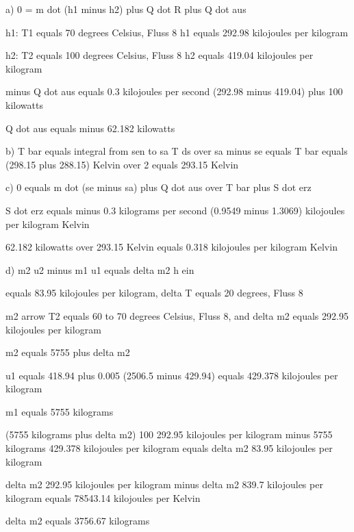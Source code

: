 a) 0 = m dot (h1 minus h2) plus Q dot R plus Q dot aus

h1: T1 equals 70 degrees Celsius, Fluss 8  
h1 equals 292.98 kilojoules per kilogram  

h2: T2 equals 100 degrees Celsius, Fluss 8  
h2 equals 419.04 kilojoules per kilogram  

minus Q dot aus equals 0.3 kilojoules per second (292.98 minus 419.04) plus 100 kilowatts

Q dot aus equals minus 62.182 kilowatts

b) T bar equals integral from sen to sa T ds over sa minus se equals T bar equals (298.15 plus 288.15) Kelvin over 2 equals 293.15 Kelvin

c) 0 equals m dot (se minus sa) plus Q dot aus over T bar plus S dot erz

S dot erz equals minus 0.3 kilograms per second (0.9549 minus 1.3069) kilojoules per kilogram Kelvin

62.182 kilowatts over 293.15 Kelvin equals 0.318 kilojoules per kilogram Kelvin

d) m2 u2 minus m1 u1 equals delta m2 h ein

equals 83.95 kilojoules per kilogram, delta T equals 20 degrees, Fluss 8

m2 arrow T2 equals 60 to 70 degrees Celsius, Fluss 8, and delta m2 equals 292.95 kilojoules per kilogram

m2 equals 5755 plus delta m2

u1 equals 418.94 plus 0.005 (2506.5 minus 429.94) equals 429.378 kilojoules per kilogram

m1 equals 5755 kilograms

(5755 kilograms plus delta m2) 100 292.95 kilojoules per kilogram minus 5755 kilograms 429.378 kilojoules per kilogram equals delta m2 83.95 kilojoules per kilogram

delta m2 292.95 kilojoules per kilogram minus delta m2 839.7 kilojoules per kilogram equals 78543.14 kilojoules per Kelvin

delta m2 equals 3756.67 kilograms
